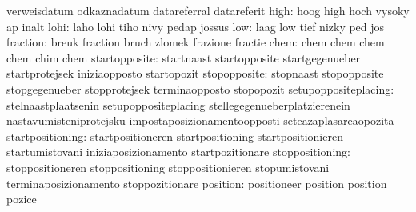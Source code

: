                                   verweisdatum                     odkaznadatum
                                  datareferral                     datareferit
                            high: hoog                             high
                                  hoch                             vysoky
                                  ap                               inalt
                            lohi: laho                             lohi
                                  tiho                             nivy
                                  pedap                            jossus
                             low: laag                             low
                                  tief                             nizky
                                  ped                              jos
                        fraction: breuk                            fraction
                                  bruch                            zlomek
                                  frazione                         fractie
                            chem: chem                             chem
                                  chem                             chem
                                  chim                             chem
                   startopposite: startnaast                       startopposite
                                  startgegenueber                  startprotejsek
                                  iniziaopposto                    startopozit
                    stopopposite: stopnaast                        stopopposite
                                  stopgegenueber                   stopprotejsek
                                  terminaopposto                   stopopozit
            setupoppositeplacing: stelnaastplaatsenin              setupoppositeplacing
                                  stellegegenueberplatzierenein    nastavumisteniprotejsku
                                  impostaposizionamentoopposti     seteazaplasareaopozita
                startpositioning: startpositioneren                startpositioning
                                  startpositionieren               startumistovani
                                  iniziaposizionamento             startpozitionare
                 stoppositioning: stoppositioneren                 stoppositioning
                                  stoppositionieren                stopumistovani
                                  terminaposizionamento            stoppozitionare
                        position: positioneer                      position
                                  position                         pozice
